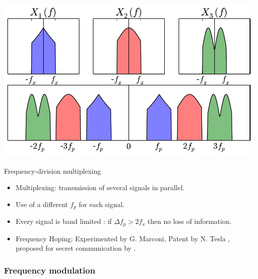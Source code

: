 \begin{center}
  \includegraphics[width=.65\linewidth]{imgs/fourier/illus_multiplex.pdf}
\end{center}
\vspace{-3mm}
   \begin{block}{Frequency-division multiplexing}
        \begin{itemize}
        \item Multiplexing: transmission of several signals in parallel.
         \item Use of a different $f_p$ for each signal.
        \item Every signal is band limited : if $\Delta f_p>2f_x$ then no loss of information.
        
        \item Frequency Hoping: Experimented by G. Marconi, Patent by N. Tesla \cite{tesla1903system}, proposed for secret communication by \cite{kiesler1942secret}.
        \end{itemize}
    \end{block}

\subsubsection{Frequency modulation}

